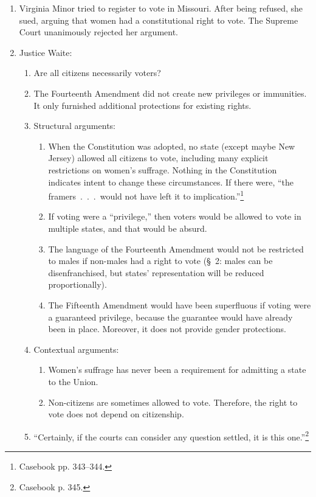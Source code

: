 \begin{enumerate}
    \item Virginia Minor tried to register to vote in Missouri. After being 
    refused, she sued, arguing that women had a constitutional right to vote. 
    The Supreme Court unanimously rejected her argument.
    \item Justice Waite:
    \begin{enumerate}
        \item Are all citizens necessarily voters?
        \item The Fourteenth Amendment did not create new privileges or 
        immunities. It only furnished additional protections for existing 
        rights.
        \item Structural arguments:
        \begin{enumerate}
            \item When the Constitution was adopted, no state (except maybe 
            New Jersey) allowed all citizens to vote, including many explicit 
            restrictions on women's suffrage. Nothing in the Constitution 
            indicates intent to change these circumstances. If there were, 
            ``the framers~.~.~.~would not have left it to 
            implication.''\footnote{Casebook pp. 343--344.}
            \item If voting were a ``privilege,'' then voters would be allowed 
            to vote in multiple states, and that would be absurd.
            \item The language of the Fourteenth Amendment would not be 
            restricted to males if non-males had a right to vote (\S\ 2: males 
            can be disenfranchised, but states' representation will be reduced 
            proportionally).
            \item The Fifteenth Amendment would have been superfluous if 
            voting were a guaranteed privilege, because the guarantee would 
            have already been in place. Moreover, it does not provide gender 
            protections.
        \end{enumerate}
        \item Contextual arguments:
        \begin{enumerate}
            \item Women's suffrage has never been a requirement for admitting 
            a state to the Union.
            \item Non-citizens are sometimes allowed to vote. Therefore, the 
            right to vote does not depend on citizenship.
        \end{enumerate}
        \item ``Certainly, if the courts can consider any question settled, it 
        is this one.''\footnote{Casebook p. 345.}
    \end{enumerate}
\end{enumerate}
 
